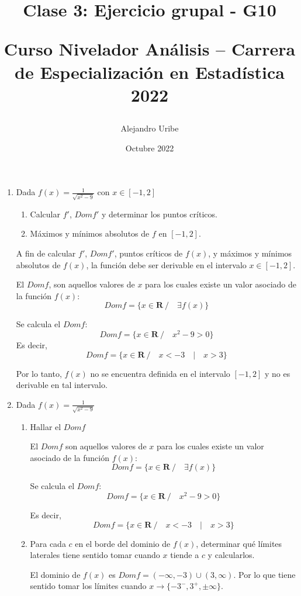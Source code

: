 \documentclass{article}
\title{
Clase 3: Ejercicio grupal - G10

Curso Nivelador Análisis – Carrera de Especialización en Estadística 2022
}
\author{Alejandro Uribe}
\date{Octubre 2022}
\begin{document}
\maketitle

\begin{enumerate}
    \item Dada $f(x) = \frac{1}{\sqrt{x^2-9}}$ con $x \in [-1, 2]$
    \begin{enumerate}
        \item Calcular $f'$, $Domf'$ y determinar los puntos críticos.
        \item Máximos y mínimos absolutos de $f$ en $[-1, 2]$.
    \end{enumerate}
    A fin de calcular $f'$, $Domf'$, puntos críticos de $f(x)$, y máximos y mínimos absolutos de $f(x)$, la función debe ser derivable en el intervalo $x\in[-1,2]$.
    
    El $Domf$, son aquellos valores de $x$ para los cuales existe un valor asociado de la función $f(x)$:
    $$Domf = \{ x \in \mathbf{R}\ / \quad \exists f(x)\}$$
    
    Se calcula el $Domf$:
    $$Domf = \{ x \in \mathbf{R}\ / \quad x^2-9 > 0\}$$
    Es decir,
    $$Domf = \{ x \in \mathbf{R}\ / \quad x<-3 \quad | \quad x>3 \}$$
    
    Por lo tanto, $f(x)$ no se encuentra definida en el intervalo $[-1,2]$ y no es derivable en tal intervalo.
    \item Dada $f(x) = \frac{1}{\sqrt{x^2-9}}$
    \begin{enumerate}
        \item Hallar el $Domf$
      
        El $Domf$ son aquellos valores de $x$ para los cuales existe un valor asociado de la función $f(x)$:
        $$Domf = \{ x \in \mathbf{R}\ / \quad \exists f(x)\}$$
      
        Se calcula el $Domf$:
        $$Domf = \{ x \in \mathbf{R}\ / \quad x^2-9 > 0\}$$
      
        Es decir,
        $$Domf = \{ x \in \mathbf{R}\ / \quad x<-3 \quad | \quad x>3 \}$$
      
        \item Para cada $c$ en el borde del dominio de $f(x)$, determinar qué límites laterales tiene sentido tomar cuando $x$ tiende a $c$ y calcularlos.
      
        El dominio de $f(x)$ es $Domf = (-\infty, -3) \cup (3, \infty)$. Por lo que tiene sentido tomar los límites cuando $x \to \{-3^-, 3^+, \pm \infty\}$. 
      

\end{enumerate}
\end{enumerate}
\end{document}
